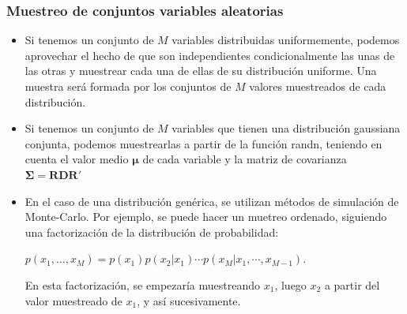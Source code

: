 \documentclass{beamer}
\numberwithin{section}{part}
\begin{document}
\begin{frame}
  \frametitle{Muestreo de conjuntos variables aleatorias}

  \footnotesize
  \begin{itemize}
    \item Si tenemos un conjunto de $M$ variables distribuidas uniformemente, podemos aprovechar el hecho de que son independientes condicionalmente las unas de las otras y muestrear cada una de ellas de su distribución uniforme. Una muestra será formada por los conjuntos de $M$ valores muestreados de cada distribución.
    \item Si tenemos un conjunto de $M$ variables que tienen una distribución gaussiana conjunta, podemos muestrearlas  a partir de la función randn, teniendo en cuenta el valor medio $\bm{\mu}$ de cada variable y la matriz de covarianza $\bm{\Sigma}=\bm{RDR}'$

    \vspace{-0.4cm}

    

    \item  En el caso de una distribución genérica, se utilizan métodos de simulación de Monte-Carlo. Por ejemplo, se puede hacer un muetreo ordenado, siguiendo una factorización de la distribución de probabilidad:

    $p(x_1,\dots,x_M)=p(x_1)p(x_2|x_1)\cdots p(x_M|x_1,\cdots,x_{M-1})$.

    En esta factorización, se empezaría muestreando $x_1$, luego $x_2$ a partir del valor muestreado de $x_1$, y así sucesivamente.  
  \end{itemize}
\end{frame}
\end{document}
